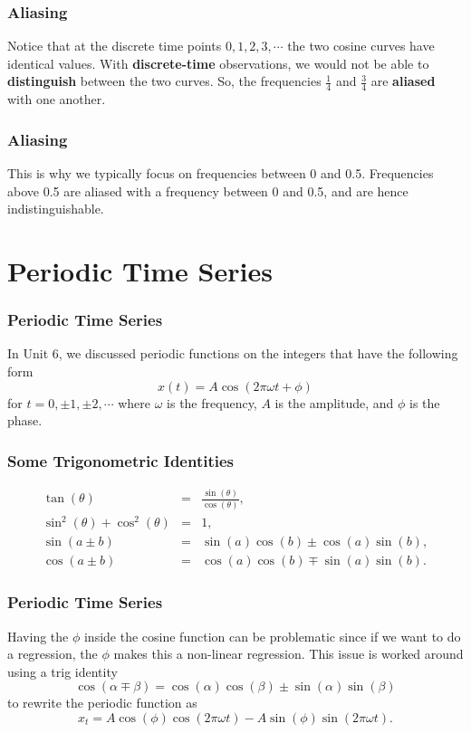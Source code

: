 \documentclass[%
xcolor=pdftex]{beamer}
\begin{document}
\begin{frame}
\frametitle{Aliasing}

Notice that at the discrete time points $0, 1, 2, 3, \cdots$ the two cosine curves have identical values. With \textbf{discrete-time} observations, we would not be able to \textbf{distinguish} between the two curves. So, the frequencies $\frac{1}{4}$ and $\frac{3}{4}$ are \textbf{aliased} with one another.

\end{frame}

\begin{frame}
\frametitle{Aliasing}

This is why we typically focus on frequencies between 0 and 0.5. Frequencies above 0.5 are aliased with a frequency between 0 and 0.5, and are hence indistinguishable.

\end{frame}



\section{Periodic Time Series}
\frame{\tableofcontents[currentsection]}

\begin{frame}
\frametitle{Periodic Time Series}

In Unit 6, we discussed periodic functions on the integers that have the following form
$$
x(t)=A \cos(2 \pi \omega t +\phi)
$$
for $t=0, \pm 1, \pm 2, \cdots $ where $\omega$ is the frequency, $A$ is the amplitude, and $\phi$ is the phase.

\end{frame}

\begin{frame}
\frametitle{Some Trigonometric Identities}

\begin{eqnarray*}
\tan(\theta) &=& \frac{\sin(\theta)}{\cos(\theta)}, \\
\sin^2(\theta) + \cos^2(\theta) &=& 1, \\
\sin(a \pm b) &=& \sin(a) \cos(b) \pm \cos(a) \sin(b), \\
\cos(a \pm b) &=& \cos(a) \cos(b) \mp \sin(a) \sin(b).
\end{eqnarray*}

\end{frame}

\begin{frame}
\frametitle{Periodic Time Series}

Having the $\phi$ inside the cosine function can be problematic since if we want to do a regression,
the $\phi$ makes this a non-linear regression. This issue is worked around using a trig identity
$$
\cos(\alpha \mp \beta)=\cos(\alpha) \cos(\beta) \pm \sin(\alpha) \sin(\beta)
$$
to rewrite the periodic function as
\begin{equation} \label{eq:periodic}
x_t=A \cos(\phi) \cos(2 \pi \omega t)-A \sin(\phi) \sin(2 \pi \omega t).
\end{equation}

\end{frame}
\end{document}
